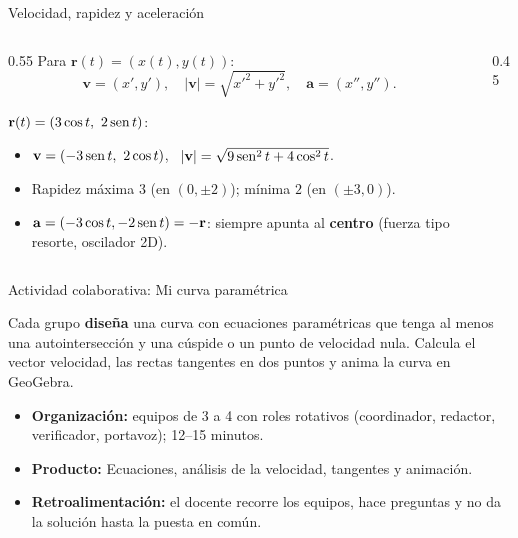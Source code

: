 \documentclass[10pt,aspectratio=169]{beamer}
\begin{document}
\begin{frame}{Velocidad, rapidez y aceleración}
  \begin{columns}
    \begin{column}{0.55\textwidth}
      Para $\mathbf r(t)=(x(t),y(t))$:
      \[ \mathbf v=(x',y'),\quad|\mathbf v|=\sqrt{x'^2+y'^2},\quad\mathbf a=(x'',y''). \]
      \begin{ejemplo}
        $\mathbf r(t)=(3\cos t,\ 2\operatorname{sen} t)$:
        \begin{itemize}
          \item $\mathbf v=(-3\operatorname{sen} t,\ 2\cos t)$, \ $|\mathbf v|=\sqrt{9\operatorname{sen}^2t+4\cos^2t}$.
          \item Rapidez máxima $3$ (en $(0,\pm2)$); mínima $2$ (en $(\pm3,0)$).
          \item $\mathbf a=(-3\cos t,-2\operatorname{sen} t)=-\mathbf r$: siempre apunta al \textbf{centro} (fuerza tipo resorte, oscilador 2D).
        \end{itemize}
      \end{ejemplo}
    \end{column}
    \begin{column}{0.45\textwidth}
      \centering
    \end{column}
  \end{columns}
\end{frame}

\begin{frame}{Actividad colaborativa: Mi curva paramétrica}
  \small
  \begin{activa}
    Cada grupo \textbf{diseña} una curva con ecuaciones paramétricas que tenga al menos una autointersección y una cúspide o un punto de velocidad nula. Calcula el vector velocidad, las rectas tangentes en dos puntos y anima la curva en GeoGebra.
  \end{activa}
  \begin{itemize}
    \item \textbf{Organización:} equipos de 3 a 4 con roles rotativos (coordinador, redactor, verificador, portavoz); 12--15 minutos.
    \item \textbf{Producto:} Ecuaciones, análisis de la velocidad, tangentes y animación.
    \item \textbf{Retroalimentación:} el docente recorre los equipos, hace preguntas y no da la solución hasta la puesta en común.
  \end{itemize}
\end{frame}
\end{document}
